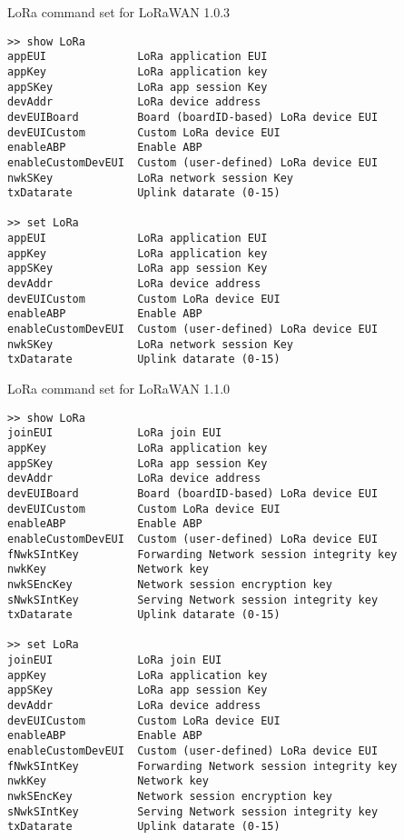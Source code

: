 \begin{docCodeExampleTitled}{LoRa command set for LoRaWAN 1.0.3}
\begin{verbatim}
>> show LoRa
appEUI              LoRa application EUI
appKey              LoRa application key
appSKey             LoRa app session Key
devAddr             LoRa device address
devEUIBoard         Board (boardID-based) LoRa device EUI
devEUICustom        Custom LoRa device EUI
enableABP           Enable ABP
enableCustomDevEUI  Custom (user-defined) LoRa device EUI
nwkSKey             LoRa network session Key
txDatarate          Uplink datarate (0-15)

>> set LoRa
appEUI              LoRa application EUI
appKey              LoRa application key
appSKey             LoRa app session Key
devAddr             LoRa device address
devEUICustom        Custom LoRa device EUI
enableABP           Enable ABP
enableCustomDevEUI  Custom (user-defined) LoRa device EUI
nwkSKey             LoRa network session Key
txDatarate          Uplink datarate (0-15)
\end{verbatim}
\end{docCodeExampleTitled}

\begin{docCodeExampleTitled}{LoRa command set for LoRaWAN 1.1.0}
\begin{verbatim}
>> show LoRa
joinEUI             LoRa join EUI
appKey              LoRa application key
appSKey             LoRa app session Key
devAddr             LoRa device address
devEUIBoard         Board (boardID-based) LoRa device EUI
devEUICustom        Custom LoRa device EUI
enableABP           Enable ABP
enableCustomDevEUI  Custom (user-defined) LoRa device EUI
fNwkSIntKey         Forwarding Network session integrity key
nwkKey              Network key
nwkSEncKey          Network session encryption key
sNwkSIntKey         Serving Network session integrity key
txDatarate          Uplink datarate (0-15)

>> set LoRa
joinEUI             LoRa join EUI
appKey              LoRa application key
appSKey             LoRa app session Key
devAddr             LoRa device address
devEUICustom        Custom LoRa device EUI
enableABP           Enable ABP
enableCustomDevEUI  Custom (user-defined) LoRa device EUI
fNwkSIntKey         Forwarding Network session integrity key
nwkKey              Network key
nwkSEncKey          Network session encryption key
sNwkSIntKey         Serving Network session integrity key
txDatarate          Uplink datarate (0-15)
\end{verbatim}
\end{docCodeExampleTitled}

